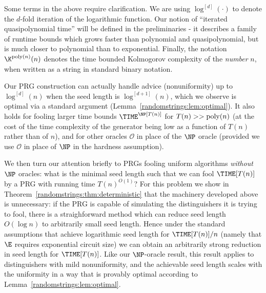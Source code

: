 Some terms in the above require clarification. We are using $ \log^{[d]}(\cdot)$ to denote the $d$-fold iteration of the logarithmic function. 
Our notion of ``iterated quasipolynomial time'' will be defined in the preliminaries - it describes a family of runtime bounds which grows faster than polynomial and quasipolynomial, but is much closer to polynomial than to exponential. Finally, the notation $\K^{\poly(n)}(n)$ denotes the time bounded Kolmogorov complexity of the \emph{number} $n$, when written as a string in standard binary notation.

Our PRG construction can actually handle advice (nonuniformity) up to $\log^{[d]}(n)$ when the seed length is $\log^{[d+1]}(n)$, which we observe is optimal via a standard argument (Lemma~\ref{randomstrings:lem:optimal}). It also holds for fooling larger time bounds $\TIME^\NP[T(n)]$ for $T(n)>> \mathrm{poly}(n)$ (at the cost of the time complexity of the generator being low as a function of $T(n)$ rather than of $n$), and for other oracles $\mathcal{O}$ in place of the $\NP$ oracle (provided we use $\mathcal{O}$ in place of $\NP$ in the hardness assumption).

We then turn our attention briefly to PRGs fooling uniform algorithms \emph{without} $\NP$ oracles: what is the minimal seed length such that we can fool $\TIME[T(n)]$ by a PRG with running time $T(n)^{O(1)}$? For this problem we show in Theorem~\ref{randomstrings:thm:deterministic} that the machinery developed above is unnecessary: if the PRG is capable of simulating the distinguishers it is trying to fool, there is a straighforward method which can reduce seed length $O(\log n)$ to arbitrarily small seed length. Hence under the standard assumptions that achieve logarithmic seed length for $\TIME[T(n)]/n$ (namely that $\E$ requires exponential circuit size) we can obtain an arbitrarily strong reduction in seed length for $\TIME[T(n)]$. Like our $\NP$-oracle result, this result applies to distinguishers with mild nonuniformity, and the achievable seed length scales with the uniformity in a way that is provably optimal according to Lemma~\ref{randomstrings:lem:optimal}.


